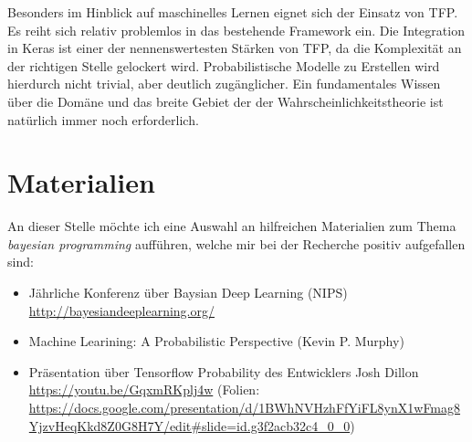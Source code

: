 \documentclass[12pt]{article}
\begin{document}
Besonders im Hinblick auf maschinelles Lernen eignet sich der Einsatz von TFP. Es reiht sich relativ problemlos in das bestehende Framework ein. Die Integration in Keras ist einer der nennenswertesten Stärken von TFP, da die Komplexität an der richtigen Stelle gelockert wird. Probabilistische Modelle zu Erstellen wird hierdurch nicht trivial, aber deutlich zugänglicher. Ein fundamentales Wissen über die Domäne und das breite Gebiet der der Wahrscheinlichkeitstheorie ist natürlich immer noch erforderlich. 

\section{Materialien}

An dieser Stelle möchte ich eine Auswahl an hilfreichen Materialien zum Thema \textit{bayesian programming} aufführen, welche mir bei der Recherche positiv aufgefallen sind:
\begin{itemize}
  \item Jährliche Konferenz über Baysian Deep Learning (NIPS) \url{http://bayesiandeeplearning.org/}
  \item Machine Learining: A Probabilistic Perspective (Kevin P. Murphy)\cite{Murphy2012}
  \item Präsentation über Tensorflow Probability des Entwicklers Josh Dillon \url{https://youtu.be/GqxmRKplj4w} (Folien: \url{https://docs.google.com/presentation/d/1BWhNVHzhFfYiFL8ynX1wFmag8YjzvHeqKkd8Z0G8H7Y/edit#slide=id.g3f2acb32c4_0_0})
\end{itemize}


\newpage



\listoffigures
\lstlistoflistings
\end{document}
